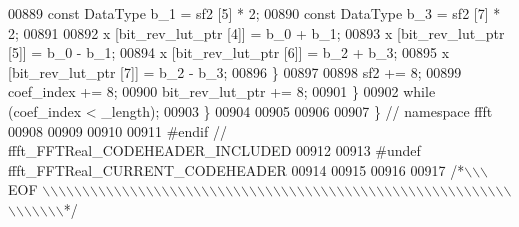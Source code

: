 \begin{DoxyCode}
00889             \textcolor{keyword}{const} DataType  b\_1 = sf2 [5] * 2;
00890             \textcolor{keyword}{const} DataType  b\_3 = sf2 [7] * 2;
00891 
00892             x [bit\_rev\_lut\_ptr [4]] = b\_0 + b\_1;
00893             x [bit\_rev\_lut\_ptr [5]] = b\_0 - b\_1;
00894             x [bit\_rev\_lut\_ptr [6]] = b\_2 + b\_3;
00895             x [bit\_rev\_lut\_ptr [7]] = b\_2 - b\_3;
00896         \}
00897 
00898         sf2 += 8;
00899         coef\_index += 8;
00900         bit\_rev\_lut\_ptr += 8;
00901     \}
00902     \textcolor{keywordflow}{while} (coef\_index < \_length);
00903 \}
00904 
00905 
00906 
00907 \}   \textcolor{comment}{// namespace ffft}
00908 
00909 
00910 
00911 \textcolor{preprocessor}{#endif  // ffft\_FFTReal\_CODEHEADER\_INCLUDED}
00912 
00913 \textcolor{preprocessor}{#undef ffft\_FFTReal\_CURRENT\_CODEHEADER}
00914 
00915 
00916 
00917 \textcolor{comment}{/*\(\backslash\)\(\backslash\)\(\backslash\) EOF \(\backslash\)\(\backslash\)\(\backslash\)\(\backslash\)\(\backslash\)\(\backslash\)\(\backslash\)\(\backslash\)\(\backslash\)\(\backslash\)\(\backslash\)\(\backslash\)\(\backslash\)\(\backslash\)\(\backslash\)\(\backslash\)\(\backslash\)\(\backslash\)\(\backslash\)\(\backslash\)\(\backslash\)\(\backslash\)\(\backslash\)\(\backslash\)\(\backslash\)\(\backslash\)\(\backslash\)\(\backslash\)\(\backslash\)\(\backslash\)\(\backslash\)\(\backslash\)\(\backslash\)\(\backslash\)\(\backslash\)\(\backslash\)\(\backslash\)\(\backslash\)\(\backslash\)\(\backslash\)\(\backslash\)\(\backslash\)\(\backslash\)\(\backslash\)\(\backslash\)\(\backslash\)\(\backslash\)\(\backslash\)\(\backslash\)\(\backslash\)\(\backslash\)\(\backslash\)\(\backslash\)\(\backslash\)\(\backslash\)\(\backslash\)\(\backslash\)\(\backslash\)\(\backslash\)\(\backslash\)\(\backslash\)\(\backslash\)\(\backslash\)\(\backslash\)\(\backslash\)\(\backslash\)*/}
\end{DoxyCode}
